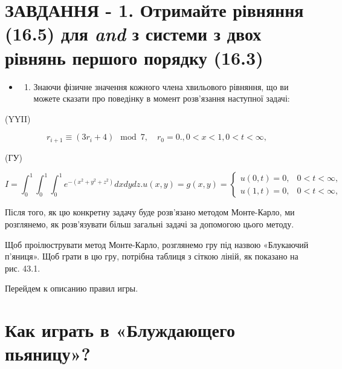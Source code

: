 \documentclass[
  ukrainian,
]{article}
\providecommand{\tightlist}{%
  \setlength{\itemsep}{0pt}\setlength{\parskip}{0pt}}
\begin{document}
\section{\texorpdfstring{ЗАВДАННЯ - 1. Отримайте рівняння (16.5) для
\emph{and} з системи з двох рівнянь першого порядку
(16.3)}{ЗАВДАННЯ - 1. Отримайте рівняння (16.5) для and з системи з двох рівнянь першого порядку (16.3)}}\label{ux437ux430ux432ux434ux430ux43dux43dux44f---1.-ux43eux442ux440ux438ux43cux430ux439ux442ux435-ux440ux456ux432ux43dux44fux43dux43dux44f-16.5-ux434ux43bux44f-and-ux437-ux441ux438ux441ux442ux435ux43cux438-ux437-ux434ux432ux43eux445-ux440ux456ux432ux43dux44fux43dux44c-ux43fux435ux440ux448ux43eux433ux43e-ux43fux43eux440ux44fux434ux43aux443-16.3}

\begin{itemize}
\tightlist
\item
  \begin{enumerate}
  \def\labelenumi{\arabic{enumi}.}
  \setcounter{enumi}{1}
  \tightlist
  \item
    Знаючи фізичне значення кожного члена хвильового рівняння, що ви
    можете сказати про поведінку в момент розв'язання наступної задачі:
  \end{enumerate}
\end{itemize}

(YYII)

\[
r_{i+1} \equiv (3r_i + 4) \mod 7, \quad r_0 = 0.
,  0 < x < 1  ,  0 < t < \infty  ,
\]

(ГУ)

\[
I = \int_{0}^{1} \int_{0}^{1} \int_{0}^{1} e^{-(x^{2}+y^{2}+z^{2})} dx dy dz.
u(x,y) = g(x,y) =
\begin{cases} u(0, t) = 0, & 0 < t < \infty, \\ u(1, t) = 0, & 0 < t < \infty, \end{cases}
\]

Після того, як цю конкретну задачу буде розв'язано методом Монте-Карло,
ми розглянемо, як розв'язувати більш загальні задачі за допомогою цього
методу.

Щоб проілюструвати метод Монте-Карло, розглянемо гру під назвою
«Блукаючий п'яниця». Щоб грати в цю гру, потрібна таблиця з сіткою
ліній, як показано на рис. 43.1.

Перейдем к описанию правил игры.

\section{Как играть в «Блуждающего
пьяницу»?}\label{ux43aux430ux43a-ux438ux433ux440ux430ux442ux44c-ux432-ux431ux43bux443ux436ux434ux430ux44eux449ux435ux433ux43e-ux43fux44cux44fux43dux438ux446ux443}
\end{document}
